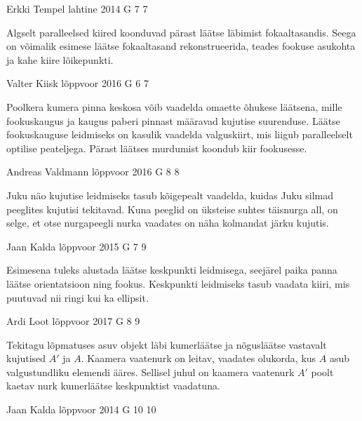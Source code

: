 \documentclass[11pt, twoside]{article}
\begin{document}
{%
{Erkki Tempel} %
{lahtine} %
{2014} %
{G 7} %
{7} %
{

\ifHint
Algselt paralleelsed kiired koonduvad pärast läätse läbimist fokaaltasandis. Seega on võimalik esimese läätse fokaaltasand rekonstrueerida, teades fookuse asukohta ja kahe kiire lõikepunkti.
\fi
}

{Valter Kiisk} %
{lõppvoor} %
{2016} %
{G 6} %
{7} %
{

\ifHint
Poolkera kumera pinna keskosa võib vaadelda omaette õhukese läätsena, mille fookuskaugus ja kaugus paberi pinnast määravad kujutise suurenduse. Läätse fookuskauguse leidmiseks on kasulik vaadelda valguskiirt, mis liigub paralleelselt optilise peateljega. Pärast läätses murdumist koondub kiir fookusesse.
\fi
}

{Andreas Valdmann} %
{lõppvoor} %
{2016} %
{G 8} %
{8} %
{

\ifHint
Juku näo kujutise leidmiseks tasub kõigepealt vaadelda, kuidas Juku silmad peeglites kujutisi tekitavad. Kuna peeglid on üksteise suhtes täisnurga all, on selge, et otse nurgapeegli nurka vaadates on näha kolmandat järku kujutis.
\fi
}

{Jaan Kalda} %
{lõppvoor} %
{2015} %
{G 7} %
{9} %
{

\ifHint
Esimesena tuleks alustada läätse keskpunkti leidmisega, seejärel paika panna läätse orientatsioon ning fookus. Keskpunkti leidmiseks tasub vaadata kiiri, mis puutuvad nii ringi kui ka ellipsit.
\fi
}

{Ardi Loot} %
{lõppvoor} %
{2017} %
{G 8} %
{9} %
{

\ifHint
Tekitagu lõpmatuses asuv objekt läbi kumerläätse ja nõgusläätse vastavalt kujutised $A'$ ja $A$. Kaamera vaatenurk on leitav, vaadates olukorda, kus $A$ asub valgustundliku elemendi ääres. Sellisel juhul on kaamera vaatenurk $A'$ poolt kaetav nurk kumerläätse keskpunktist vaadatuna.
\fi
}

{Jaan Kalda} %
{lõppvoor} %
{2014} %
{G 10} %
{10} %
{

}}
\end{document}
